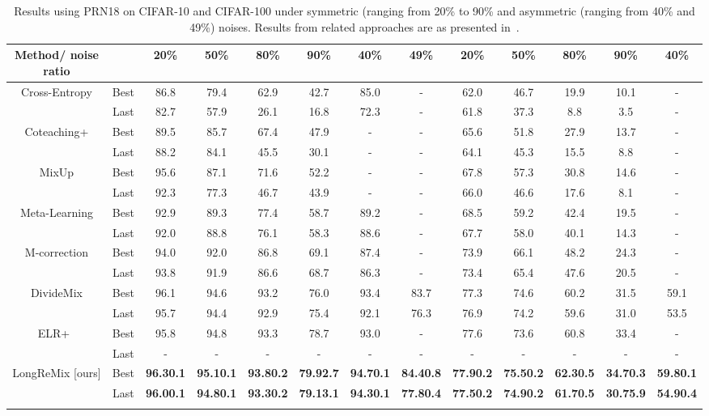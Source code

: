 \documentclass[review]{elsarticle}
\begin{document}
\begin{table}[ht]
{\begin{tabular}{cc|cccc|cc||cccc| c}
Method/ noise ratio & &  20\% & 50\% & 80\% & 90\% & 40\%& 49\% & 20\% & 50\% & 80\% & 90\% & 40\% \\
\midrule
\multirow{2}{*}{Cross-Entropy \cite{li2020dividemix}}& Best & 86.8 & 79.4 & 62.9 & 42.7 & 85.0 & - & 62.0 & 46.7 & 19.9 & 10.1 & -\\
    & Last & 82.7 & 57.9 & 26.1 & 16.8 & 72.3 & - & 61.8 & 37.3 & 8.8 & 3.5& -\\
\midrule
\multirow{2}{*}{Coteaching+ \cite{yu2019does}} & Best & 89.5 & 85.7 & 67.4& 47.9& - & -&65.6& 51.8 & 27.9 & 13.7& -\\
    & Last & 88.2 & 84.1 & 45.5& 30.1& - & -&64.1& 45.3 & 15.5 & 8.8& -\\
\midrule
\multirow{2}{*}{MixUp \cite{zhang2017mixup}} &Best & 95.6 & 87.1 & 71.6& 52.2& - & - & 67.8& 57.3 & 30.8 & 14.6& -\\
 &Last & 92.3 & 77.3 & 46.7& 43.9& - & - & 66.0& 46.6 & 17.6 & 8.1& -\\
\midrule
\multirow{2}{*}{Meta-Learning \cite{li2019learning}}&Best & 92.9 & 89.3 & 77.4& 58.7& 89.2 & - & 68.5& 59.2 & 42.4 & 19.5& - \\
   &Last & 92.0 & 88.8 & 76.1& 58.3& 88.6 & - & 67.7& 58.0 & 40.1 & 14.3& - \\
\midrule
\multirow{2}{*}{M-correction \cite{arazo2019unsupervised}}&Best& 94.0 & 92.0 & 86.8& 69.1& 87.4 & - & 73.9& 66.1 & 48.2 & 24.3& - \\
   &Last& 93.8 & 91.9 & 86.6& 68.7& 86.3 & - & 73.4& 65.4 & 47.6 & 20.5& - \\
\midrule
\multirow{2}{*}{DivideMix \cite{li2020dividemix}}& Best &96.1 & 94.6 & 93.2 & 76.0& 93.4 & 83.7 & 77.3 & 74.6 & 60.2 & 31.5& 59.1 \\
  & Last & 95.7 & 94.4 & 92.9 & 75.4& 92.1 & 76.3 & 76.9 & 74.2 & 59.6 & 31.0& 53.5 \\
\midrule
\multirow{2}{*}{ELR+~\cite{liu2020early}}& Best & 95.8 & 94.8 & 93.3 & 78.7 & 93.0 & - & 77.6 & 73.6 & 60.8 & 33.4& - \\
  & Last & - & - & - & -& - & - & - & - & - & - & -\\
\midrule
\multirow{2}{*}{LongReMix [ours] }& Best & \textbf{96.30.1} & \textbf{95.10.1} & \textbf{93.80.2} & \textbf{79.92.7} & \textbf{94.70.1} & \textbf{84.40.8} & \textbf{77.90.2} & \textbf{75.50.2} & \textbf{62.30.5} & \textbf{34.70.3}& \textbf{59.80.1}\\
    & Last & \textbf{96.00.1} & \textbf{94.80.1} & \textbf{93.30.2} & \textbf{79.13.1} & \textbf{94.30.1} & \textbf{77.80.4} & \textbf{77.50.2} & \textbf{74.90.2} & \textbf{61.70.5} & \textbf{30.75.9}& \textbf{54.90.4}\\
\bottomrule \\
\end{tabular}
}
\caption{Results using PRN18 on CIFAR-10 and CIFAR-100 under symmetric (ranging from 20\% to 90\% and asymmetric (ranging from 40\% and 49\%) noises. Results from related approaches are as presented in~\cite{li2020dividemix}.} 
\label{tab:results_cifar}
\end{table}
\end{document}
